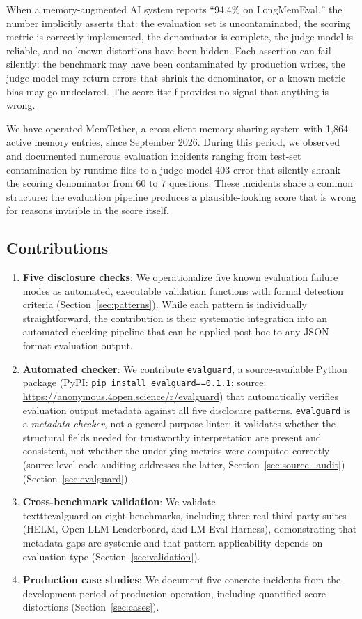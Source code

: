 \documentclass[11pt]{article}
\begin{document}
When a memory-augmented AI system reports ``94.4\% on LongMemEval,'' the number implicitly asserts that: the evaluation set is uncontaminated, the scoring metric is correctly implemented, the denominator is complete, the judge model is reliable, and no known distortions have been hidden. Each assertion can fail silently: the benchmark may have been contaminated by production writes, the judge model may return errors that shrink the denominator, or a known metric bias may go undeclared. The score itself provides no signal that anything is wrong.

We have operated MemTether, a cross-client memory sharing system with 1{,}864 active memory entries, since September 2026. During this period, we observed and documented numerous evaluation incidents ranging from test-set contamination by runtime files to a judge-model 403 error that silently shrank the scoring denominator from 60 to 7 questions. These incidents share a common structure: the evaluation pipeline produces a plausible-looking score that is wrong for reasons invisible in the score itself.

\subsection{Contributions}

\begin{enumerate}
\item \textbf{Five disclosure checks}: We operationalize five known evaluation failure modes as automated, executable validation functions with formal detection criteria (Section~\ref{sec:patterns}). While each pattern is individually straightforward, the contribution is their systematic integration into an automated checking pipeline that can be applied post-hoc to any JSON-format evaluation output.
\item \textbf{Automated checker}: We contribute \texttt{evalguard}, a source-available Python package (PyPI: \texttt{pip install evalguard==0.1.1}; source: \url{https://anonymous.4open.science/r/evalguard}) that automatically verifies evaluation output metadata against all five disclosure patterns. \texttt{evalguard} is a \emph{metadata checker}, not a general-purpose linter: it validates whether the structural fields needed for trustworthy interpretation are present and consistent, not whether the underlying metrics were computed correctly (source-level code auditing addresses the latter, Section~\ref{sec:source_audit}) (Section~\ref{sec:evalguard}).
\item \textbf{Cross-benchmark validation}: We validate \\texttt{evalguard} on eight benchmarks, including three real third-party suites (HELM, Open LLM Leaderboard, and LM Eval Harness), demonstrating that metadata gaps are systemic and that pattern applicability depends on evaluation type (Section~\ref{sec:validation}).
\item \textbf{Production case studies}: We document five concrete incidents from the development period of production operation, including quantified score distortions (Section~\ref{sec:cases}).
\end{enumerate}
\end{document}
